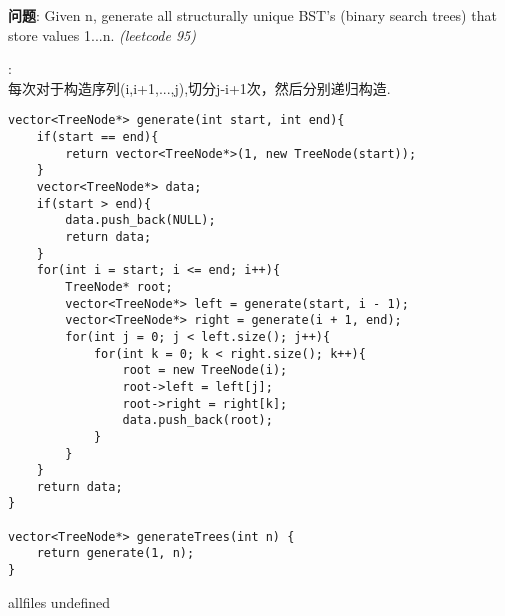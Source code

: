 \documentclass{article}
\begin{document}
\begin{CJK}{UTF8}{gbsn}     %

\else
	
\begin{description}
	\item{\textbf{问题}}: Given n, generate all structurally unique BST's (binary search trees) that store values 1...n. \textit{(leetcode 95)}
	\item{\textbf{}} : 
	\\每次对于构造序列(i,i+1,...,j),切分j-i+1次，然后分别递归构造.
	\begin{lstlisting}
vector<TreeNode*> generate(int start, int end){
	if(start == end){
		return vector<TreeNode*>(1, new TreeNode(start));
	}
	vector<TreeNode*> data;
	if(start > end){
		data.push_back(NULL);
		return data;
	}
	for(int i = start; i <= end; i++){
		TreeNode* root;
		vector<TreeNode*> left = generate(start, i - 1);
		vector<TreeNode*> right = generate(i + 1, end);
		for(int j = 0; j < left.size(); j++){
			for(int k = 0; k < right.size(); k++){
				root = new TreeNode(i);
				root->left = left[j];
				root->right = right[k];
				data.push_back(root);
			}
		}
	}
	return data;
}

vector<TreeNode*> generateTrees(int n) {
	return generate(1, n);
}
	\end{lstlisting}
\end{description}

\fi

\ifx allfiles undefined
\end{CJK}
\end{document}
